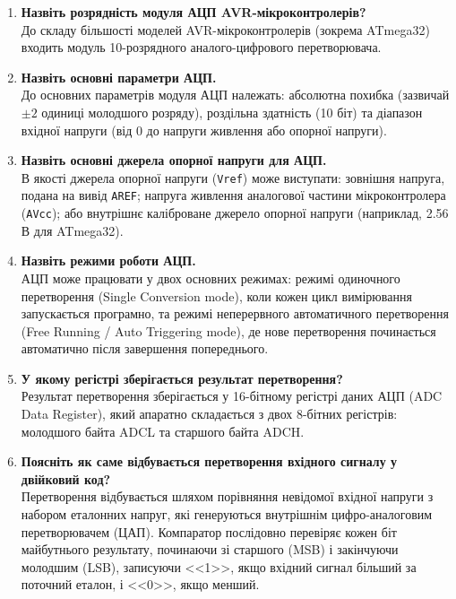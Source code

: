 \documentclass[14pt, a4paper]{extreport}
\begin{document}
	\begin{enumerate}
		\item \textbf{Назвіть розрядність модуля АЦП AVR-мікроконтролерів?} \\ До складу більшості моделей AVR-мікроконтролерів (зокрема ATmega32) входить модуль 10-розрядного аналого-цифрового перетворювача.
		
		\item \textbf{Назвіть основні параметри АЦП.} \\ До основних параметрів модуля АЦП належать: абсолютна похибка (зазвичай $\pm 2$ одиниці молодшого розряду), роздільна здатність (10 біт) та діапазон вхідної напруги (від 0 до напруги живлення або опорної напруги).
		
		\item \textbf{Назвіть основні джерела опорної напруги для АЦП.} \\ В якості джерела опорної напруги (\texttt{Vref}) може виступати: зовнішня напруга, подана на вивід \texttt{AREF}; напруга живлення аналогової частини мікроконтролера (\texttt{AVcc}); або внутрішнє каліброване джерело опорної напруги (наприклад, 2.56 В для ATmega32).
		
		\item \textbf{Назвіть режими роботи АЦП.} \\ АЦП може працювати у двох основних режимах: режимі одиночного перетворення (Single Conversion mode), коли кожен цикл вимірювання запускається програмно, та режимі неперервного автоматичного перетворення (Free Running / Auto Triggering mode), де нове перетворення починається автоматично після завершення попереднього.
		
		\item \textbf{У якому регістрі зберігається результат перетворення?} \\ Результат перетворення зберігається у 16-бітному регістрі даних АЦП (ADC Data Register), який апаратно складається з двох 8-бітних регістрів: молодшого байта ADCL та старшого байта ADCH.
		
		\item \textbf{Поясніть як саме відбувається перетворення вхідного сигналу у двійковий код?} \\ Перетворення відбувається шляхом порівняння невідомої вхідної напруги з набором еталонних напруг, які генеруються внутрішнім цифро-аналоговим перетворювачем (ЦАП). Компаратор послідовно перевіряє кожен біт майбутнього результату, починаючи зі старшого (MSB) і закінчуючи молодшим (LSB), записуючи <<1>>, якщо вхідний сигнал більший за поточний еталон, і <<0>>, якщо менший.
		

\end{enumerate}
\end{document}
